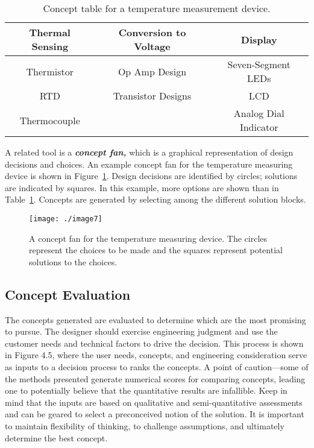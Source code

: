 \begin{table}
\caption{Concept table for a temperature measurement device.}
\label{table:conceptTemperature}
\begin{tabular}{|c|c|c|}
\hline
\rowcolor{Gray}
\textbf{Thermal Sensing} &
\textbf{Conversion to Voltage} &
\textbf{Display} \\ \hline
Thermistor & Op Amp Design & Seven-Segment LEDs \\ \hline
RTD & Transistor Designs & LCD \\ \hline
Thermocouple & & Analog Dial Indicator \\ \hline
\end{tabular}
\end{table}

A related tool is a \emph{\textbf{concept fan,}} which is a graphical
representation of design decisions and choices. An example concept fan
for the temperature measuring device is shown in 
Figure~\ref{figure:conceptFan}. Design
decisions are identified by circles; solutions are indicated by squares.
In this example, more options are shown than in 
Table~\ref{table:conceptTemperature}. Concepts are
generated by selecting among the different solution blocks.

\begin{figure}
\texttt{[image: ./image7]}
\caption{A concept fan for the temperature measuring device.
The circles represent the choices to be made and the squares represent
potential solutions to the choices.}
\label{figure:conceptFan}
\end{figure}


\subsection{Concept Evaluation}\label{concept-evaluation}

The concepts generated are evaluated to determine which are the most
promising to pursue. The designer should exercise engineering judgment
and use the customer needs and technical factors to drive the decision.
This process is shown in Figure 4.5, where the user needs, concepts, and
engineering consideration serve as inputs to a decision process to ranks
the concepts. A point of caution---some of the methods presented
generate numerical scores for comparing concepts, leading one to
potentially believe that the quantita­tive results are infallible. Keep
in mind that the inputs are based on qualitative and semi-quantitative
assessments and can be geared to select a preconceived notion of the
solution. It is important to maintain flexibility of thinking, to
challenge assumptions, and ultimately determine the best concept.


